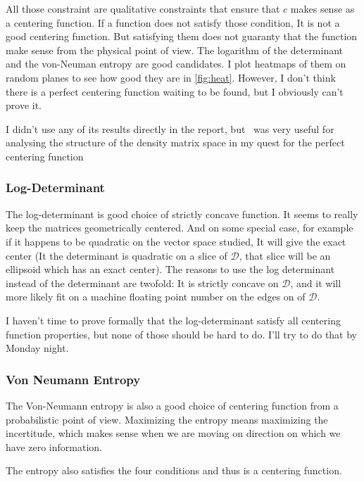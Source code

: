 \documentclass[10pt,a4paper]{report}
\theoremstyle{plain}
\theoremstyle{definition}
\theoremstyle{remark}
\begin{document}
All those constraint are qualitative constraints that ensure that $c$ makes sense
as a centering function. If a function does not satisfy those condition, It is
not a good centering function. But satisfying them does not guaranty that the function
make sense from the physical point of view. The logarithm of the determinant and
the von-Neuman entropy are good candidates. I plot heatmaps of them on random
planes to see how good they are in \cref{fig:heat}. However, I don't think
there is a perfect centering function waiting to be found, but I obviously can't
prove it.

I didn't use any of its results directly in the report, but~\cite{Bhatia07} was
very useful for analysing the structure of the density matrix space in my quest
for the perfect centering function

\subsubsection{Log-Determinant}

The log-determinant is good choice of strictly concave function. It seems to
really keep the matrices geometrically centered. And on some special case, for
example if it happens to be quadratic on the vector space studied, It will give
the exact center (It the determinant is quadratic on a slice of $\mathcal{D}$,
that slice will be an ellipsoid which has an exact center). The reasons to use
the log determinant instead of the determinant are twofold: It is strictly
concave on $\mathcal{D}$, and it will more likely fit on a machine floating
point number on the edges on of $\mathcal{D}$.

I haven't time to prove formally that the log-determinant satisfy all centering
function properties, but none of those should be hard to do. I'll try to do that
by Monday night.

\subsubsection{Von Neumann Entropy}

The Von-Neumann entropy is also a good choice of centering function from a probabilistic
point of view. Maximizing the entropy means maximizing the incertitude, which
makes sense when we are moving on direction on which we have zero information.

The entropy also satisfies the four conditions and thus is a centering function.
\end{document}
